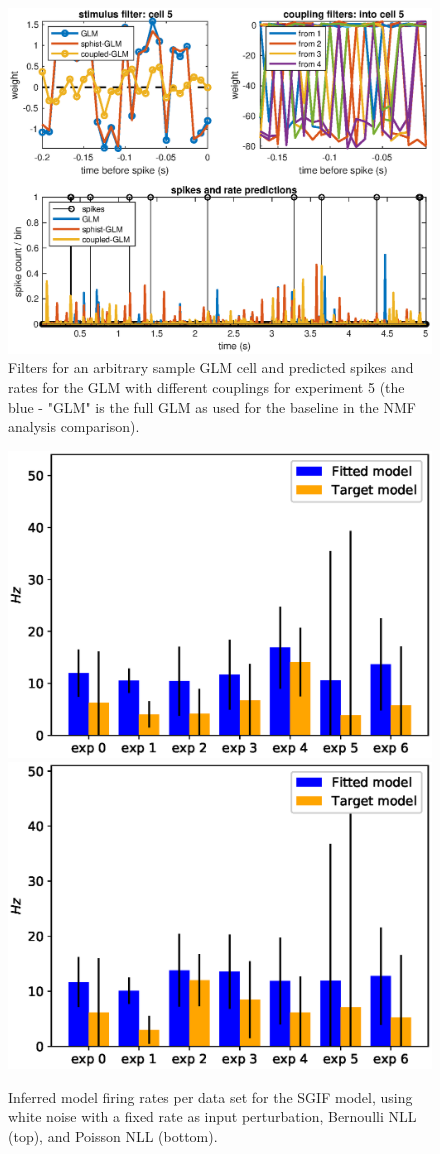 \documentclass[mphil,deptreport,ianc]{infthesis} %
\begin{document}
\begin{figure}
    \centering
    \includegraphics[width=0.9\columnwidth]{figures/sleep/GLM_multi_cell5_5sec_bin_white_noise.eps}
    \caption{Filters for an arbitrary sample GLM cell and predicted spikes and rates for the GLM with different couplings for experiment 5 (the blue - "GLM" is the full GLM as used for the baseline in the NMF analysis comparison).}
    \label{fig:glm_sample_cell_5_exp_5}
\end{figure}


\begin{figure}
    \centering
    \includegraphics[width=0.49\columnwidth]{figures/sleep/approx_rate_across_exp_microGIF_bernoulli_nll_vs_fitted.eps}
    \includegraphics[width=0.49\columnwidth]{figures/sleep/approx_rate_across_exp_microGIF_poisson_nll_vs_fitted.eps}
    \caption{Inferred model firing rates per data set for the SGIF model, using white noise with a fixed rate as input perturbation, Bernoulli NLL (top), and Poisson NLL (bottom).}
    \label{fig:approx_rates_sleep_exps_SGIF}
\end{figure}
\end{document}
